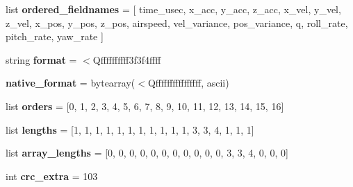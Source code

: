 \begin{DoxyCompactItemize}
list {\bfseries ordered\+\_\+fieldnames} = \mbox{[} \textquotesingle{}time\+\_\+usec\textquotesingle{}, \textquotesingle{}x\+\_\+acc\textquotesingle{}, \textquotesingle{}y\+\_\+acc\textquotesingle{}, \textquotesingle{}z\+\_\+acc\textquotesingle{}, \textquotesingle{}x\+\_\+vel\textquotesingle{}, \textquotesingle{}y\+\_\+vel\textquotesingle{}, \textquotesingle{}z\+\_\+vel\textquotesingle{}, \textquotesingle{}x\+\_\+pos\textquotesingle{}, \textquotesingle{}y\+\_\+pos\textquotesingle{}, \textquotesingle{}z\+\_\+pos\textquotesingle{}, \textquotesingle{}airspeed\textquotesingle{}, \textquotesingle{}vel\+\_\+variance\textquotesingle{}, \textquotesingle{}pos\+\_\+variance\textquotesingle{}, \textquotesingle{}q\textquotesingle{}, \textquotesingle{}roll\+\_\+rate\textquotesingle{}, \textquotesingle{}pitch\+\_\+rate\textquotesingle{}, \textquotesingle{}yaw\+\_\+rate\textquotesingle{} \mbox{]}
\item 
\mbox{\label{classpymavlink_1_1dialects_1_1v10_1_1MAVLink__control__system__state__message_aea4a04b7f1d4be13aebd72245668e0bf}} 
string {\bfseries format} = \textquotesingle{}$<$Qffffffffff3f3f4ffff\textquotesingle{}
\item 
\mbox{\label{classpymavlink_1_1dialects_1_1v10_1_1MAVLink__control__system__state__message_a0ed495a53f73fb9237689823b08b2443}} 
{\bfseries native\+\_\+format} = bytearray(\textquotesingle{}$<$Qffffffffffffffff\textquotesingle{}, \textquotesingle{}ascii\textquotesingle{})
\item 
\mbox{\label{classpymavlink_1_1dialects_1_1v10_1_1MAVLink__control__system__state__message_afe400e64bf0a0591c737a18a0b860f6e}} 
list {\bfseries orders} = \mbox{[}0, 1, 2, 3, 4, 5, 6, 7, 8, 9, 10, 11, 12, 13, 14, 15, 16\mbox{]}
\item 
\mbox{\label{classpymavlink_1_1dialects_1_1v10_1_1MAVLink__control__system__state__message_a1ea0c25c5b2c69b0e48b7e6e5c16ad10}} 
list {\bfseries lengths} = \mbox{[}1, 1, 1, 1, 1, 1, 1, 1, 1, 1, 1, 3, 3, 4, 1, 1, 1\mbox{]}
\item 
\mbox{\label{classpymavlink_1_1dialects_1_1v10_1_1MAVLink__control__system__state__message_ad127223cc797b1ee224ededecf28c7cc}} 
list {\bfseries array\+\_\+lengths} = \mbox{[}0, 0, 0, 0, 0, 0, 0, 0, 0, 0, 0, 3, 3, 4, 0, 0, 0\mbox{]}
\item 
\mbox{\label{classpymavlink_1_1dialects_1_1v10_1_1MAVLink__control__system__state__message_a6f5a4e20f9e7f0d89b4f64ba39b6f940}} 
int {\bfseries crc\+\_\+extra} = 103
\end{DoxyCompactItemize}


